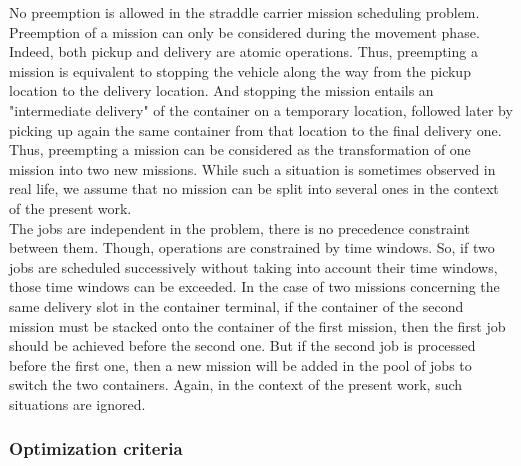 \documentclass[a4paper,12pt]{article}
\begin{document}
No preemption is allowed in the straddle carrier mission scheduling problem. Preemption of a mission can only be considered during the movement phase. Indeed, both pickup and delivery are atomic operations. Thus, preempting a mission is equivalent to stopping the vehicle along the way from the pickup location to the delivery location. And stopping the mission entails an "intermediate delivery" of the container on a temporary location, followed later by picking up again the same container from that location to the final delivery one. Thus, preempting a mission can be considered as the transformation of one mission into two new missions. While such a situation is sometimes observed in real life, we assume that no mission can be split into several ones in the context of the present work.\\

The jobs are independent in the problem, there is no precedence constraint between them. Though, operations are constrained by time windows. So, if two jobs are scheduled successively without taking into account their time windows, those time windows can be exceeded. In the case of two missions concerning the same delivery slot in the container terminal, if the container of the second mission must be stacked onto the container of the first mission, then the first job should be achieved before the second one. But if the second job is processed before the first one, then a new mission will be added in the pool of jobs to switch the two containers. Again, in the context of the present work, such situations are ignored. %

\subsubsection{Optimization criteria}
\end{document}
